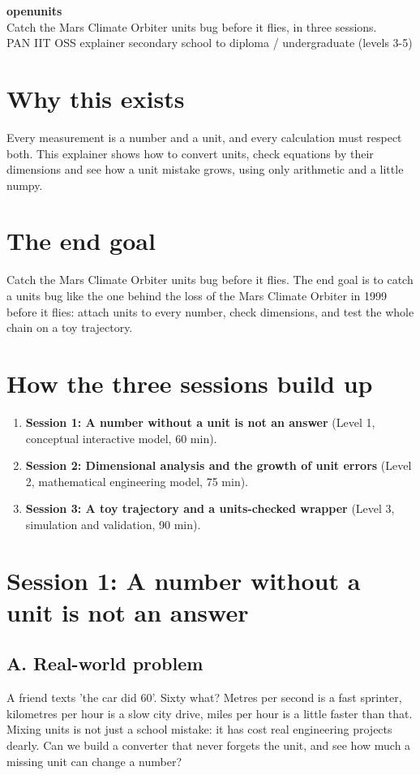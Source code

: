 \documentclass[11pt,a4paper]{article}
\begin{document}
\begin{center}{\LARGE\bfseries openunits}\\[0.4em]{\large Catch the Mars Climate Orbiter units bug before it flies, in three sessions.}\\[0.2em]\small PAN IIT OSS explainer \textbullet{} secondary school to diploma / undergraduate (levels 3-5)\end{center}

\section*{Why this exists}
Every measurement is a number and a unit, and every calculation must respect both. This explainer shows how to convert units, check equations by their dimensions and see how a unit mistake grows, using only arithmetic and a little numpy.

\section*{The end goal}
Catch the Mars Climate Orbiter units bug before it flies. The end goal is to catch a units bug like the one behind the loss of the Mars Climate Orbiter in 1999 before it flies: attach units to every number, check dimensions, and test the whole chain on a toy trajectory.

\section*{How the three sessions build up}
\begin{enumerate}[nosep]
\item \textbf{Session 1: A number without a unit is not an answer} (Level 1, conceptual interactive model, 60 min).
\item \textbf{Session 2: Dimensional analysis and the growth of unit errors} (Level 2, mathematical engineering model, 75 min).
\item \textbf{Session 3: A toy trajectory and a units-checked wrapper} (Level 3, simulation and validation, 90 min).
\end{enumerate}

\section{Session 1: A number without a unit is not an answer}

\subsection*{A. Real-world problem}
A friend texts 'the car did 60'. Sixty what? Metres per second is a fast sprinter, kilometres per hour is a slow city drive, miles per hour is a little faster than that. Mixing units is not just a school mistake: it has cost real engineering projects dearly. Can we build a converter that never forgets the unit, and see how much a missing unit can change a number?
\end{document}
